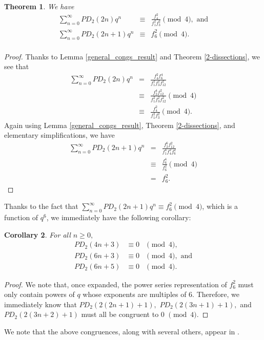 \documentclass{amsart}
\newtheorem{theorem}{Theorem}[section]
\newtheorem{corollary}[theorem]{Corollary}
\begin{document}
\begin{theorem}
\label{2n_mod4}
We have 
\begin{eqnarray*}
\sum_{n=0}^{\infty} PD_2(2n)q^n &\equiv & \frac{f_4^2}{f_1^2f_3^2} \pmod{4}, \textrm{\ \ \ and} \\
\sum_{n=0}^{\infty} PD_2(2n+1)q^n &\equiv & f_6^2 \pmod{4}. \\
\end{eqnarray*}
\end{theorem}
\begin{proof}
Thanks to Lemma \ref{general_congs_result} and Theorem \ref{2-dissections}, we see that 
\begin{eqnarray*}
 \sum_{n=0}^{\infty} PD_2(2n)q^{n} 
 &=& \frac{f_4^2f_{6}^4}{f_1^2f_3^2f_{12}^2} \\
 &\equiv & \frac{f_2^4f_{12}^2}{f_1^2f_3^2f_{12}^2} \pmod{4} \\
 &\equiv & \frac{f_4^2}{f_1^2f_3^2} \pmod{4}.
\end{eqnarray*}
Again using Lemma \ref{general_congs_result}, Theorem \ref{2-dissections}, and elementary simplifications, we have 
\begin{eqnarray*}
 \sum_{n=0}^{\infty} PD_2(2n+1)q^{n} 
 &=&  
 \frac{f_2^6f_{12}^2}{f_1^4f_4^2f_{6}^2} \\
 &\equiv &  
 \frac{f_{6}^4}{f_{6}^2} \pmod{4}\\
 &=& 
 f_6^2. 
\end{eqnarray*}
\end{proof}
Thanks to the fact that   $\sum_{n=0}^{\infty} PD_2(2n+1)q^{n} \equiv f_6^2 \pmod{4}$, which is a function of $q^6$, we immediately have the following corollary:  
\begin{corollary}
\label{4n3_6n3_6n5_mod4}
For all $n\geq 0,$ 
\begin{eqnarray*}
PD_2(4n+3) &\equiv 0 & \pmod{4}, \\
PD_2(6n+3) &\equiv 0 & \pmod{4}, \textrm{\ \ \ and} \\
PD_2(6n+5) &\equiv 0 & \pmod{4}.
\end{eqnarray*}   
\end{corollary}
\begin{proof} 
We note that, once expanded, the power series representation of $f_6^2$ must only contain powers of $q$ whose exponents are multiples of 6.  Therefore, we immediately know that $PD_2(2(2n+1)+1),$ $PD_2(2(3n+1)+1),$ and $PD_2(2(3n+2)+1)$ must all be congruent to 0 $\pmod{4}.$ 
\end{proof}
We note that the above congruences, along with several others, appear in \cite[Theorem 1.4]{BO}.  
\end{document}
